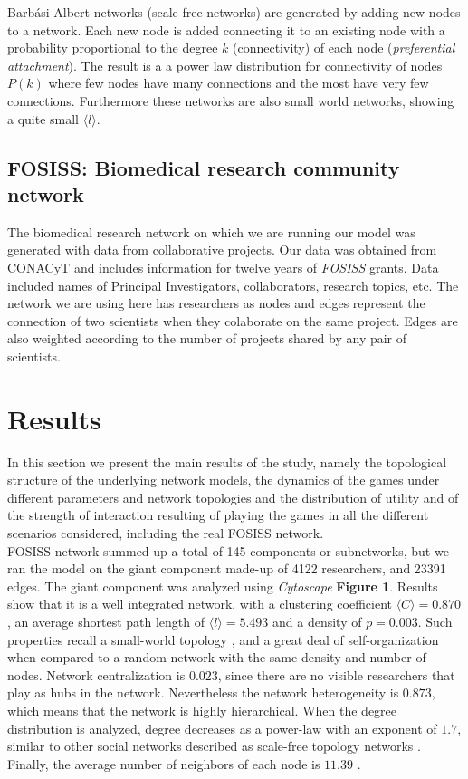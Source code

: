 \documentclass[11pt]{article}
\begin{document}
Barb\'asi-Albert networks \cite{Barabasi1999} (scale-free networks) are generated by adding new nodes to a network. Each new node is added connecting it to an existing node with a probability proportional to the degree $k$ (connectivity) of each node (\textit{preferential attachment}). The result is a a power law distribution for connectivity of nodes $P(k)$ where few nodes have many connections and the most have very few connections. Furthermore these networks are also small world networks, showing a quite small $\langle l \rangle$.


\subsection{FOSISS: Biomedical research community network}

The biomedical research network on which we are running our model was generated 
with data from collaborative projects. Our data was obtained from CONACyT and includes information for twelve years of \textit{FOSISS} grants. Data included names of Principal Investigators, collaborators, research topics, etc. The network we are using here has researchers as nodes and edges represent the connection of two scientists when they colaborate on the same project. Edges are also weighted according to the number of projects shared by any pair of scientists.\\


\section{Results}
\label{sec:3}

In this section we present the main results of the study, namely the topological
structure of the underlying network models, the dynamics of the games under
different parameters and network topologies and the distribution of utility and
of the strength of interaction resulting of playing the games in all the
different scenarios considered, including the real FOSISS network.\\


FOSISS network summed-up a total of 145 components or subnetworks, but we ran
the model on the giant component made-up of 4122 researchers, and 23391 edges.
The giant component was analyzed using \textit{Cytoscape} \textbf{Figure
  1}. Results show that it is a well integrated network, with a clustering
coefficient $\langle C \rangle = 0.870$, an average shortest path length of
$\langle l \rangle = 5.493$  and a density of $p = 0.003$. Such properties
recall a small-world topology \cite{Watts1998}, and a great deal of
self-organization when compared to a random network with the same density and
number of nodes. Network centralization is $0.023$, since there are no visible
researchers that play as hubs in the network. Nevertheless the network
heterogeneity is $0.873$, which means that the network is highly
hierarchical. When the degree distribution is analyzed, degree decreases as a
power-law with an exponent of $1.7$, similar to other social networks described
as scale-free topology networks \cite{Barabasi1999}. Finally, the average number
of neighbors of each node is $11.39$ \cite{Shannon2003}.\\
\end{document}
